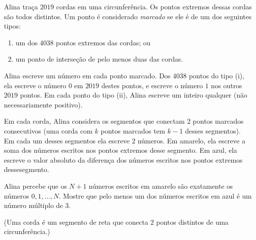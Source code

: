 Alina traça $2019$ cordas em uma circunferência. Os pontos extremos dessas cordas são todos distintos.
Um ponto é considerado \textit{marcado} se ele é de um dos seguintes tipos:

\begin{enumerate}[label = (\alph*)]
	\item um dos 4038 pontos extremos das cordas; ou
	\item um ponto de interseção de pelo menos duas das cordas.
\end{enumerate}

Alina escreve um número em cada ponto marcado.
Dos 4038 pontos do tipo (i), ela escreve o número $0$ em $2019$ destes pontos, e escreve o número $1$ nos outros $2019$ pontos.
Em cada ponto do tipo (ii), Alina escreve um inteiro qualquer (não necessariamente positivo).

Em cada corda, Alina considera os segmentos que conectam $2$ pontos marcados consecutivos (uma corda com $k$ pontos marcados tem $k-1$ desses segmentos).
Em cada um desses segmentos ela escreve $2$ números.
Em amarelo, ela escreve a soma dos números escritos nos pontos extremos desse segmento.
Em azul, ela escreve o valor absoluto da diferença dos números escritos nos pontos extremos dessesegmento.

Alina percebe que os $N+1$ números escritos em amarelo são exatamente os números $0, 1, \dots, N$.
Mostre que pelo menos um dos números escritos em azul é um número múltiplo de 3.

(Uma corda é um segmento de reta que conecta $2$ pontos distintos de uma circunferência.)
